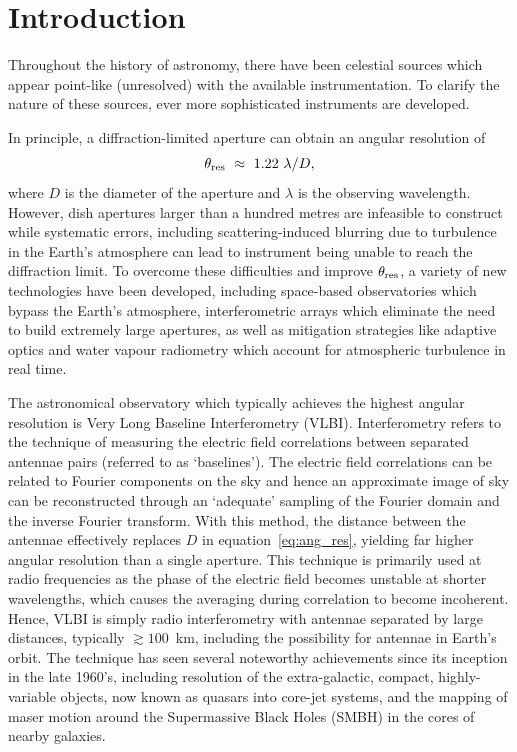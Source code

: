 \chapter{Introduction}

Throughout the history of astronomy, there have been celestial sources which appear point-like (unresolved) with the available instrumentation. To clarify the nature of these sources, ever more sophisticated instruments are developed. 

In principle, a diffraction-limited aperture can obtain an angular resolution of
\begin{equation}\label{eq:ang_res}
 \theta_{\rm res}\ \approx \ 1.22\ \lambda / D,
\end{equation}
where $D$ is the diameter of the aperture and $\lambda$ is the observing wavelength. However, dish apertures larger than a hundred metres are infeasible to construct while systematic errors, including scattering-induced blurring due to turbulence in the Earth's atmosphere can lead to instrument being unable to reach the diffraction limit. To overcome these difficulties and improve $\theta_{\rm res}$, a variety of new technologies have been developed, including space-based observatories which bypass the Earth's atmosphere, interferometric arrays which eliminate the need to build extremely large apertures, as well as mitigation strategies like adaptive optics and water vapour radiometry which account for atmospheric turbulence in real time.  


The astronomical observatory which typically achieves the highest angular resolution is Very Long Baseline Interferometry (VLBI). Interferometry  refers to the technique of measuring the electric field correlations between separated antennae pairs (referred to as `baselines'). The electric field correlations can be related to Fourier components on the sky and hence an approximate image of sky can be reconstructed through an `adequate' sampling of the Fourier domain and the inverse Fourier transform. With this method, the distance between the antennae effectively replaces $D$ in equation~\ref{eq:ang_res}, yielding far higher angular resolution than a single aperture. This technique is primarily used at radio frequencies as the phase of the electric field becomes unstable at shorter wavelengths, which causes the averaging during correlation to become incoherent. Hence, VLBI is simply radio interferometry with antennae separated by large distances, typically $\gtrsim 100$~km, including the possibility for antennae in Earth's orbit. The technique has seen several noteworthy achievements since its inception in the late 1960's, including resolution of the extra-galactic, compact, highly-variable objects, now known as quasars into core-jet systems, and the mapping of maser motion around the Supermassive Black Holes (SMBH) in the cores of nearby galaxies.

